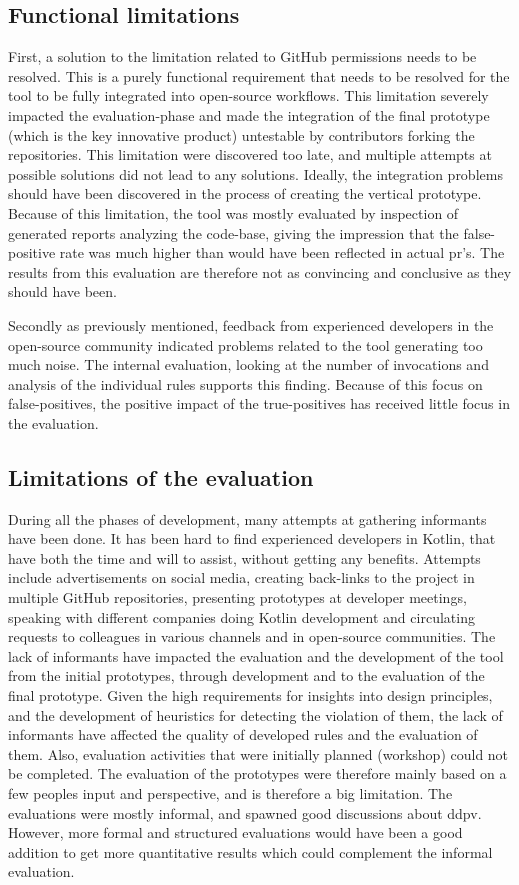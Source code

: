 \documentclass[pdftex,10pt,b5paper,twoside]{report}
\begin{document}
\subsection*{Functional limitations}
First, a solution to the limitation related to GitHub permissions needs to be resolved. This is a purely functional requirement that needs to be resolved for the tool to be fully integrated into open-source workflows. This limitation severely impacted the evaluation-phase and made the integration of the final prototype (which is the key innovative product) untestable by contributors forking the repositories. This limitation were discovered too late, and multiple attempts at possible solutions did not lead to any solutions. Ideally, the integration problems should have been discovered in the process of creating the vertical prototype. Because of this limitation, the tool was mostly evaluated by inspection of generated reports analyzing the code-base, giving the impression that the false-positive rate was much higher than would have been reflected in actual \gls{pr}'s. The results from this evaluation are therefore not as convincing and conclusive as they should have been.

Secondly as previously mentioned, feedback from experienced developers in the open-source community indicated problems related to the tool generating too much noise. The internal evaluation, looking at the number of invocations and analysis of the individual rules supports this finding. Because of this focus on false-positives, the positive impact of the true-positives has received little focus in the evaluation.  

\subsection*{Limitations of the evaluation}
During all the phases of development, many attempts at gathering informants have been done. It has been hard to find experienced developers in Kotlin, that have both the time and will to assist, without getting any benefits. Attempts include advertisements on social media, creating back-links to the project in multiple GitHub repositories, presenting prototypes at developer meetings, speaking with different companies doing Kotlin development and circulating requests to colleagues in various channels and in open-source communities. The lack of informants have impacted the evaluation and the development of the tool from the initial prototypes, through development and to the evaluation of the final prototype. Given the high requirements for insights into design principles, and the development of heuristics for detecting the violation of them, the lack of informants have affected the quality of developed rules and the evaluation of them. Also, evaluation activities that were initially planned (workshop) could not be completed. The evaluation of the prototypes were therefore mainly based on a few peoples input and perspective, and is therefore a big limitation. The evaluations were mostly informal, and spawned good discussions about \gls{ddpv}. However, more formal and structured evaluations would have been a good addition to get more quantitative results which could complement the informal evaluation.
\end{document}
